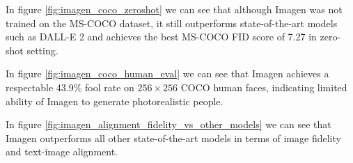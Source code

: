 In figure \ref{fig:imagen_coco_zeroshot} we can see that although Imagen was not trained on the MS-COCO dataset, it still outperforms state-of-the-art models such as DALL-E 2 \cite{dalle_2} and achieves the best MS-COCO FID score of 7.27 in zero-shot setting.

In figure \ref{fig:imagen_coco_human_eval} we can see that Imagen achieves a respectable 43.9\% fool rate on $256\times 256$ COCO human faces, indicating limited ability of Imagen to generate photorealistic people.

In figure \ref{fig:imagen_alignment_fidelity_vs_other_models} we can see that Imagen outperforms all other state-of-the-art models in terms of image fidelity and text-image alignment.
